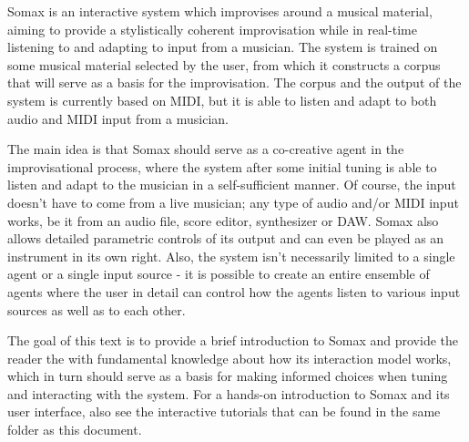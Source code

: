 Somax is an interactive system which improvises around a musical material, aiming to provide a stylistically coherent improvisation while in real-time listening to and adapting to input from a musician. The system is trained on some musical material selected by the user, from which it constructs a corpus that will serve as a basis for the improvisation. The corpus and the output of the system is currently based on MIDI, but it is able to listen and adapt to both audio and MIDI input from a musician. 

The main idea is that Somax should serve as a co-creative agent in the improvisational process, where the system after some initial tuning is able to listen and adapt to the musician in a self-sufficient manner. Of course, the input doesn't have to come from a live musician; any type of audio and/or MIDI input works, be it from an audio file, score editor, synthesizer or DAW. Somax also allows detailed parametric controls of its output and can even be played as an instrument in its own right. Also, the system isn't necessarily limited to a single agent or a single input source - it is possible to create an entire ensemble of agents where the user in detail can control how the agents listen to various input sources as well as to each other.

The goal of this text is to provide a brief introduction to Somax and provide the reader the with fundamental knowledge about how its interaction model works, which in turn should serve as a basis for making informed choices when tuning and interacting with the system. For a hands-on introduction to Somax and its user interface, also see the interactive tutorials that can be found in the same folder as this document.